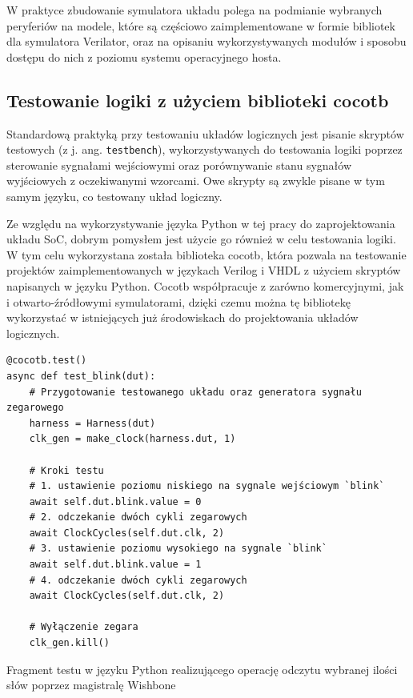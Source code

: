 W praktyce zbudowanie symulatora układu polega na podmianie wybranych peryferiów na modele, które są częściowo zaimplementowane w formie bibliotek dla symulatora Verilator, oraz na opisaniu wykorzystywanych modułów i sposobu dostępu do nich z poziomu systemu operacyjnego hosta.

\subsection{Testowanie logiki z użyciem biblioteki cocotb}

Standardową praktyką przy testowaniu układów logicznych jest pisanie skryptów testowych (z j. ang. \texttt{testbench}), wykorzystywanych do testowania logiki poprzez sterowanie sygnałami wejściowymi oraz porównywanie stanu sygnałów wyjściowych z oczekiwanymi wzorcami. Owe skrypty są zwykle pisane w tym samym języku, co testowany układ logiczny.

Ze względu na wykorzystywanie języka Python w tej pracy do zaprojektowania układu SoC, dobrym pomysłem jest użycie go również w celu testowania logiki. W tym celu wykorzystana została biblioteka cocotb\cite{cocotb:2022:Online}, która pozwala na testowanie projektów zaimplementowanych w językach Verilog i VHDL z użyciem skryptów napisanych w języku Python. Cocotb współpracuje z zarówno komercyjnymi, jak i otwarto-źródłowymi symulatorami, dzięki czemu można tę bibliotekę wykorzystać w istniejących już środowiskach do projektowania układów logicznych.

\begin{listing}[H]
\begin{verbatim}
@cocotb.test()
async def test_blink(dut):
    # Przygotowanie testowanego układu oraz generatora sygnału zegarowego
    harness = Harness(dut)
    clk_gen = make_clock(harness.dut, 1)

    # Kroki testu
    # 1. ustawienie poziomu niskiego na sygnale wejściowym `blink`
    await self.dut.blink.value = 0
    # 2. odczekanie dwóch cykli zegarowych
    await ClockCycles(self.dut.clk, 2)
    # 3. ustawienie poziomu wysokiego na sygnale `blink`
    await self.dut.blink.value = 1
    # 4. odczekanie dwóch cykli zegarowych
    await ClockCycles(self.dut.clk, 2)

    # Wyłączenie zegara
    clk_gen.kill()
\end{verbatim}
\caption{\label{lst:tooling-sampletest}Fragment testu w języku Python realizującego operację odczytu wybranej ilości słów poprzez magistralę Wishbone}
\end{listing}

